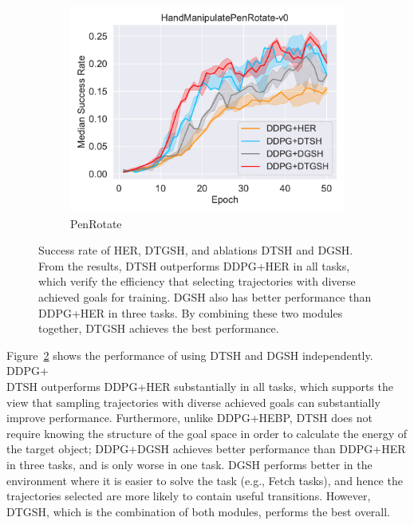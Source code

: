 \begin{figure}[h!]
\begin{subfigure}[t]{0.49\textwidth}
    \includegraphics[width=\textwidth]{figures/chapter4/HandManipulatePenRotate-v0_ab1.pdf}
    \caption{PenRotate}
    \label{subfig:baseline_handpen_ab1}
  \end{subfigure}\hfill
  \caption[Results of ablation studies of different modules.]{Success rate of HER, DTGSH, and ablations DTSH and DGSH. From the results, DTSH outperforms DDPG+HER in all tasks, which verify the efficiency that selecting trajectories with diverse achieved goals for training. DGSH also has better performance than DDPG+HER in three tasks. By combining these two modules together, DTGSH achieves the best performance.}
  \label{fig:ablation1}
\end{figure}

Figure~\ref{fig:ablation1} shows the performance of using DTSH and DGSH independently. DDPG+\\DTSH outperforms DDPG+HER substantially in all tasks, which supports the view that sampling trajectories with diverse achieved goals can substantially improve performance. Furthermore, unlike DDPG+HEBP, DTSH does not require knowing the structure of the goal space in order to calculate the energy of the target object; DDPG+DGSH achieves better performance than DDPG+HER in three tasks, and is only worse in one task. DGSH performs better in the environment where it is easier to solve the task (e.g., Fetch tasks), and hence the trajectories selected are more likely to contain useful transitions. However, DTGSH, which is the combination of both modules, performs the best overall.

